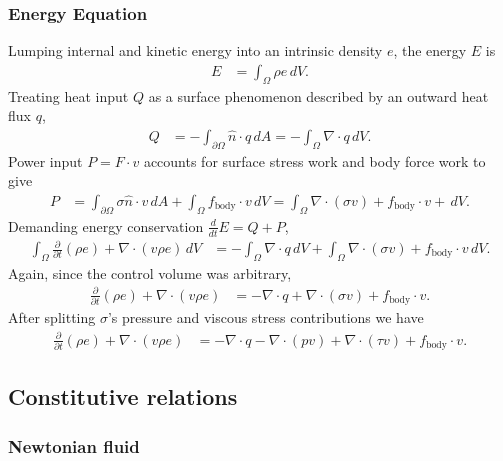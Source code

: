 \documentclass[letterpaper,11pt,nointlimits]{amsart}
\begin{document}
\subsubsection{Energy Equation} 
Lumping internal and kinetic energy into an intrinsic density $e$, 
the energy $E$ is
\begin{align}
  E &= \int_{\Omega} \rho{}e \, dV 
  .
\end{align}
Treating heat input $Q$ as a surface phenomenon described by an outward
heat flux $q$, 
\begin{align}
  Q 
  &= 
  -\int_{\partial\Omega}\hat{n}\cdot{}q\,dA
  =
  -\int_{\Omega}\nabla\cdot{}q\,dV
  .
\end{align}
Power input $P=F\cdot{}v$ accounts for surface stress work and body force work
to give
\begin{align}
  P 
  &= 
    \int_{\partial\Omega} \sigma{}\hat{n} \cdot{} v \, dA 
  + \int_{\Omega} f_\text{body} \cdot{} v \, dV 
  = \int_{\Omega} \nabla\cdot(\sigma{v}) + f_\text{body} \cdot{} v + \, dV 
  .
\end{align}
Demanding energy conservation $\frac{d}{dt}E=Q+P$,
\begin{align}
\int_{\Omega}\frac{\partial}{\partial{}t} \left( \rho{}e \right)
  +
  \nabla\cdot\left(v\rho{}e\right)
\,dV
&=
  - \int_{\Omega}\nabla\cdot{}q\,dV
  + \int_{\Omega} \nabla\cdot(\sigma{}v) + f_\text{body} \cdot{} v \, dV 
  .
\end{align}
Again, since the control volume was arbitrary, 
\begin{align}
  \frac{\partial}{\partial{}t}\left(\rho{}e\right)
  +
  \nabla\cdot\left(v\rho{}e\right)
&=
  - \nabla\cdot{}q + \nabla\cdot(\sigma{}v) + f_\text{body} \cdot{} v 
  .
\end{align}
After splitting $\sigma$'s pressure and viscous stress contributions we have
\begin{align}
  \label{eq:cons_energy}
  \frac{\partial}{\partial{}t}\left(\rho{}e\right)
  +
  \nabla\cdot\left(v\rho{}e\right)
&=
  - \nabla\cdot{}q 
  - \nabla\cdot{}(pv)
  + \nabla\cdot{}(\tau{}v)
  + f_\text{body} \cdot{} v 
  .
\end{align}

\subsection{Constitutive relations}

\subsubsection{Newtonian fluid}
\end{document}
